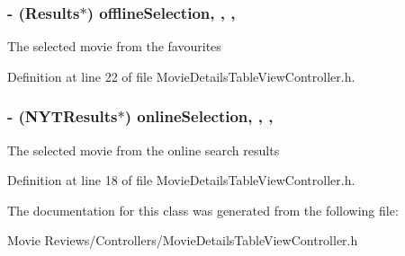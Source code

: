 \subsubsection[{offline\+Selection}]{\setlength{\rightskip}{0pt plus 5cm}-\/ ({\bf Results}$\ast$) offline\+Selection\hspace{0.3cm}{\ttfamily [read]}, {\ttfamily [write]}, {\ttfamily [nonatomic]}, {\ttfamily [strong]}}\label{interface_movie_details_table_view_controller_a2d7f8d8a99899a814ea8f6938c35186c}
The selected movie from the favourites 

Definition at line 22 of file Movie\+Details\+Table\+View\+Controller.\+h.

\subsubsection[{online\+Selection}]{\setlength{\rightskip}{0pt plus 5cm}-\/ ({\bf N\+Y\+T\+Results}$\ast$) online\+Selection\hspace{0.3cm}{\ttfamily [read]}, {\ttfamily [write]}, {\ttfamily [nonatomic]}, {\ttfamily [strong]}}\label{interface_movie_details_table_view_controller_a7a3ecf4ac3c7785033f15ee77f1ec351}
The selected movie from the online search results 

Definition at line 18 of file Movie\+Details\+Table\+View\+Controller.\+h.



The documentation for this class was generated from the following file\+:\begin{DoxyCompactItemize}
\item 
Movie Reviews/\+Controllers/Movie\+Details\+Table\+View\+Controller.\+h\end{DoxyCompactItemize}
